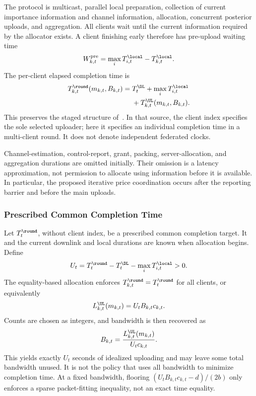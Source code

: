 The protocol is multicast, parallel local preparation, collection of current importance information and channel information, allocation, concurrent posterior uploads, and aggregation. All clients wait until the current information required by the allocator exists. A client finishing early therefore has pre-upload waiting time
\begin{equation}
 W_{k,t}^{\mathrm{pre}}
 =\max_iT_{i,t}^{\local}-T_{k,t}^{\local}.
 \label{fkl:eq:waiting}
\end{equation}
The per-client elapsed completion time is
\begin{equation}
 \begin{split}
 T_{k,t}^{\round}(m_{k,t},B_{k,t})
 ={}&T_t^{\DL}+\max_iT_{i,t}^{\local}\\
 &+T_{k,t}^{\UL}(m_{k,t},B_{k,t}).
 \end{split}
 \label{fkl:eq:round-time}
\end{equation}
This preserves the staged structure of~\cite[Eq.~(18)]{scheduling}. In that source, the client index specifies the sole selected uploader; here it specifies an individual completion time in a multi-client round. It does not denote independent federated clocks.

Channel-estimation, control-report, grant, packing, server-allocation, and aggregation durations are omitted initially. Their omission is a latency approximation, not permission to allocate using information before it is available. In particular, the proposed iterative price coordination occurs after the reporting barrier and before the main uploads.

\subsubsection{Prescribed Common Completion Time}
Let $T_t^{\round}$, without client index, be a prescribed common completion target. It and the current downlink and local durations are known when allocation begins. Define
\begin{equation}
 U_t=T_t^{\round}-T_t^{\DL}-\max_iT_{i,t}^{\local}>0.
 \label{fkl:eq:uplink-budget}
\end{equation}
The equality-based allocation enforces $T_{k,t}^{\round}=T_t^{\round}$ for all clients, or equivalently
\begin{equation}
 L_{k,t}^{\UL}(m_{k,t})=U_tB_{k,t}c_{k,t}.
 \label{fkl:eq:time-equality}
\end{equation}
Counts are chosen as integers, and bandwidth is then recovered as
\begin{equation}
 B_{k,t}=\frac{L_{k,t}^{\UL}(m_{k,t})}{U_tc_{k,t}}.
 \label{fkl:eq:bandwidth-recovery}
\end{equation}
This yields exactly $U_t$ seconds of idealized uploading and may leave some total bandwidth unused. It is not the policy that uses all bandwidth to minimize completion time. At a fixed bandwidth, flooring $(U_tB_{k,t}c_{k,t}-d)/(2b)$ only enforces a sparse packet-fitting inequality, not an exact time equality.


